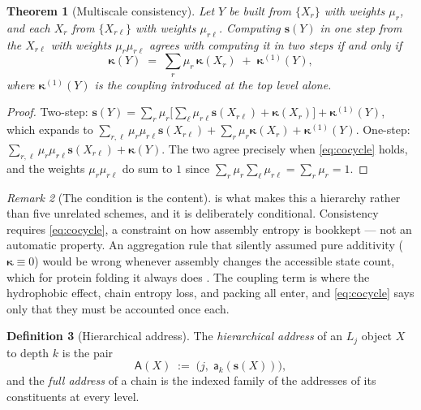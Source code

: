 \documentclass[11pt,twocolumn,a4paper]{article}
\theoremstyle{thmstyle}
\newtheorem{theorem}{Theorem}[section]
\theoremstyle{definition}
\newtheorem{definition}[theorem]{Definition}
\theoremstyle{remark}
\newtheorem{remark}[theorem]{Remark}
\newcommand{\addr}{\mathsf{a}}
\newcommand{\Addr}{\mathsf{A}}
\begin{document}
\begin{theorem}[Multiscale consistency]
\label{thm:multiscale}
Let $Y$ be built from $\{X_r\}$ with weights $\mu_r$, and each $X_r$
from $\{X_{r\ell}\}$ with weights $\mu_{r\ell}$. Computing
$\mathbf{s}(Y)$ in one step from the $X_{r\ell}$ with weights
$\mu_r\mu_{r\ell}$ agrees with computing it in two steps if and only if
\begin{equation}
  \boldsymbol\kappa(Y)
  \;=\;
  \sum_r \mu_r\,\boldsymbol\kappa(X_r)
  \;+\; \boldsymbol\kappa^{(1)}(Y),
  \label{eq:cocycle}
\end{equation}
where $\boldsymbol\kappa^{(1)}(Y)$ is the coupling introduced at the
top level alone.
\end{theorem}

\begin{proof}
Two-step: $\mathbf{s}(Y) = \sum_r \mu_r\bigl[\sum_\ell \mu_{r\ell}
\mathbf{s}(X_{r\ell}) + \boldsymbol\kappa(X_r)\bigr] +
\boldsymbol\kappa^{(1)}(Y)$, which expands to
$\sum_{r,\ell}\mu_r\mu_{r\ell}\mathbf{s}(X_{r\ell}) + \sum_r\mu_r
\boldsymbol\kappa(X_r) + \boldsymbol\kappa^{(1)}(Y)$. One-step:
$\sum_{r,\ell}\mu_r\mu_{r\ell}\mathbf{s}(X_{r\ell}) +
\boldsymbol\kappa(Y)$. The two agree precisely when \eqref{eq:cocycle}
holds, and the weights $\mu_r\mu_{r\ell}$ do sum to $1$ since
$\sum_r\mu_r\sum_\ell\mu_{r\ell} = \sum_r \mu_r = 1$.
\end{proof}

\begin{remark}[The condition is the content]
\label{rem:cocycle-content}
 is what makes this a hierarchy rather than five
unrelated schemes, and it is deliberately conditional. Consistency
requires \eqref{eq:cocycle}, a constraint on how assembly entropy is
bookkept --- not an automatic property. An aggregation rule that
silently assumed pure additivity ($\boldsymbol\kappa \equiv 0$) would
be wrong whenever assembly changes the accessible state count, which
for protein folding it always does \citep{anfinsen1973,creighton1993}.
The coupling term is where the hydrophobic effect, chain entropy loss,
and packing all enter, and \eqref{eq:cocycle} says only that they must
be accounted once each.
\end{remark}

\begin{definition}[Hierarchical address]
\label{def:hier-address}
The \emph{hierarchical address} of an $L_j$ object $X$ to depth $k$ is
the pair
\begin{equation}
  \Addr(X) \;:=\; \bigl(j,\; \addr_k(\mathbf{s}(X))\bigr),
  \label{eq:hier-address}
\end{equation}
and the \emph{full address} of a chain is the indexed family of the
addresses of its constituents at every level.
\end{definition}
\end{document}
